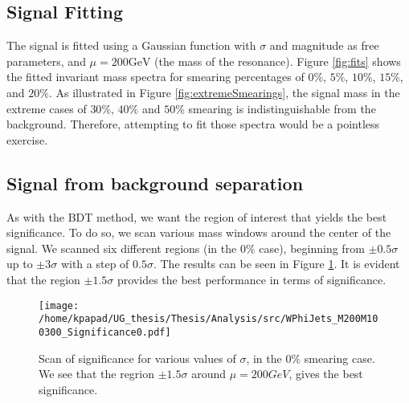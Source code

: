 \subsection{Signal Fitting}
\label{sec:org3f69715}
\label{sec:Signal_fitting}
The signal is fitted using a Gaussian function with \(\sigma\) and magnitude as free parameters, and \(\mu = 200\text{GeV}\) (the mass of the resonance). Figure \ref{fig:fits} shows the fitted invariant mass spectra for smearing percentages of \(0\%\), \(5\%\), \(10\%\), \(15\%\), and \(20\%\). As illustrated in Figure \ref{fig:extremeSmearings}, the signal mass in the extreme cases of \(30\%\text{, }40\%\) and \(50\%\) smearing is indistinguishable from the background. Therefore, attempting to fit those spectra would be a pointless exercise.
\subsection{Signal from background separation}
\label{sec:orgec7f99c}
\label{sec:Signal_from_background_separation}
As with the BDT method, we want the region of interest that yields the best significance. To do so, we scan various mass windows around the center of the signal. We scanned six different regions (in the \(0\%\) case), beginning from \(\pm 0.5\sigma\) up to \(\pm 3\sigma\) with a step of \(0.5\sigma\). The results can be seen in Figure \ref{fig:Scan0}. It is evident that the region \(\pm 1.5\sigma\) provides the best performance in terms of significance.
\begin{figure}[h!]
\centering
\texttt{[image: /home/kpapad/UG\_thesis/Thesis/Analysis/src/WPhiJets\_M200M100300\_Significance0.pdf]}
\caption{Scan of significance for various values of $\sigma$, in the $0\%$ smearing case. We see that the regrion $\pm 1.5\sigma$ around $\mu=200GeV$, gives the best significance.}
\label{fig:Scan0}
\end{figure}

